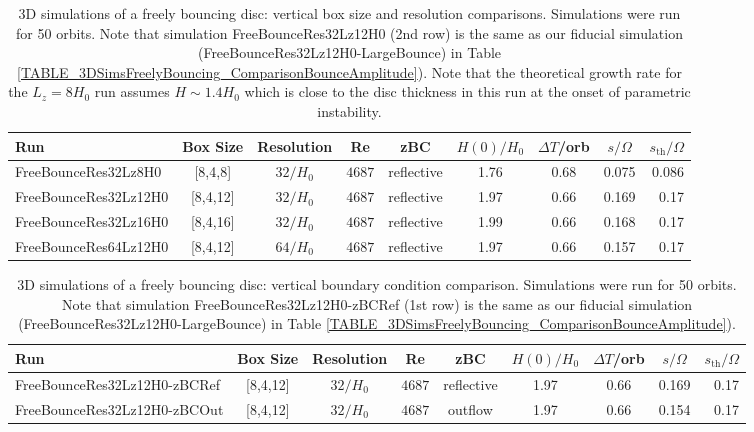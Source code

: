\documentclass[fleqn,usenatbib]{mnras}
\begin{document}
\begin{table}
\centering
\caption{3D simulations of a freely bouncing disc: vertical box size and resolution comparisons. Simulations were run for 50 orbits. Note that simulation FreeBounceRes32Lz12H0 (2nd row) is the same as our fiducial simulation (FreeBounceRes32Lz12H0-LargeBounce) in Table \ref{TABLE_3DSimsFreelyBouncing_ComparisonBounceAmplitude}). Note that the theoretical growth rate for the $L_z = 8H_0$ run assumes $H \sim 1.4H_0$ which is close to the disc thickness in this run at the onset of parametric instability.}
\label{TABLE_3DSimsFreelyBouncing_ComparisonBoxSizeResolution}
 	\begin{tabular}{lcccccccr}
		\hline
		Run	& Box Size & Resolution & Re & zBC & $H(0)/H_0$ & $\Delta T$/orb &$s/\Omega$& $s_{\text{th}}/\Omega$\\ 
        \hline
        FreeBounceRes32Lz8H0 & [8,4,8] & $32/H_0$ & $4687$ & reflective & 1.76 & 0.68 & 0.075 & 0.086 \\
        FreeBounceRes32Lz12H0 & [8,4,12] & $32/H_0$ & $4687$ & reflective & 1.97 & 0.66 & 0.169 & 0.17\\
        FreeBounceRes32Lz16H0 & [8,4,16] & $32/H_0$ & $4687$ & reflective & 1.99 & 0.66 & 0.168 & 0.17\\
        \hline
        FreeBounceRes64Lz12H0 & [8,4,12] & $64/H_0$ & $4687$ & reflective & 1.97 & 0.66 & 0.157 & 0.17 \\
        \hline
	\end{tabular}
\end{table}


\begin{table}
\centering
\caption{3D simulations of a freely bouncing disc: vertical boundary condition comparison. Simulations were run for 50 orbits. Note that simulation FreeBounceRes32Lz12H0-zBCRef (1st row) is the same as our fiducial simulation (FreeBounceRes32Lz12H0-LargeBounce) in Table \ref{TABLE_3DSimsFreelyBouncing_ComparisonBounceAmplitude}).}
\label{TABLE_3DSimsFreelyBouncing_ComparisonVerticalBCs}
 	\begin{tabular}{lcccccccr}
		\hline
		Run	& Box Size & Resolution & Re & zBC & $H(0)/H_0$ & $\Delta T$/orb & $s/\Omega$& $s_{\text{th}}/\Omega$ \\ 
        \hline
        FreeBounceRes32Lz12H0-zBCRef & [8,4,12] & $32/H_0$ & $4687$ & reflective & 1.97 & 0.66 & 0.169 & 0.17\\
        FreeBounceRes32Lz12H0-zBCOut & [8,4,12] & $32/H_0$ & $4687$ & outflow & 1.97 & 0.66 & 0.154 & 0.17 \\
        \hline
	\end{tabular}
\end{table}
\end{document}

